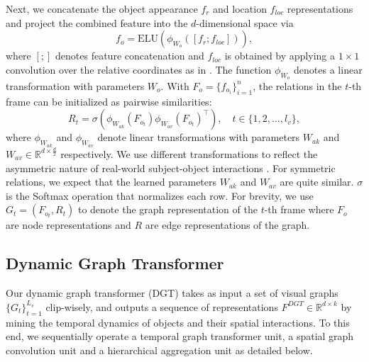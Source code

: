\documentclass[runningheads]{llncs}
\begin{document}
Next, we concatenate the object appearance $f_r$ and location $f_{loc}$ representations and project the combined feature into the $d$-dimensional space via
\begin{equation}
\label{equ:fo}
    f_o = \mathrm{ELU}(\phi_{W_o}([f_r;f_{loc}])),
\end{equation}
where $[;]$ denotes feature concatenation and $f_{loc}$ is obtained by applying a $1 \times 1$ convolution over the relative coordinates as in \cite{xiao2021video}. The function $\phi_{W_o}$ denotes a linear transformation with parameters $W_o$. With $F_o\!=\!\{f_{o_i}\}_{i=1}^n$, the relations in the $t$-th frame can be initialized as 
pairwise similarities:
\begin{equation}
\label{equ:aa}
    R_t = \sigma(\phi_{W_{ak}}(F_{o_t})\phi_{W_{av}}(F_{o_t})^\mathrm{\top}), \quad t\in\{1, 2, \dots, l_v\},
\end{equation}
where $\phi_{W_{ak}}$ and $\phi_{W_{av}}$ denote linear transformations with parameters $W_{ak}$ and $W_{av} \in \mathbb{R}^{d \times \frac{d}{2}}$ respectively. We use different transformations to reflect the asymmetric nature of real-world subject-object interactions \cite{krishna2018referring,xiao2020visual}. For symmetric relations, we expect that the learned parameters $W_{ak}$ and $W_{av}$ are quite similar. $\sigma$ is the Softmax operation that normalizes each row. 
For brevity, we use $G_t=(F_{o_t}, R_t)$ to denote the graph representation of the $t$-th frame where $F_{o}$ are node representations and $R$ are edge representations of the graph.
\vspace{-0.3cm}

\subsection{Dynamic Graph Transformer}
Our dynamic graph transformer (DGT)  takes as input a set of visual graphs $\{G_t\}_{t=1}^{L_v}$ clip-wisely, and outputs a sequence of representations $F^{DGT}\in\mathbb{R}^{d\times k}$ by mining the temporal dynamics of objects and their spatial interactions. To  this end, we sequentially operate    a temporal graph transformer unit, a spatial graph convolution unit and a hierarchical aggregation unit as detailed below.
\vspace{-0.3cm}
\end{document}
